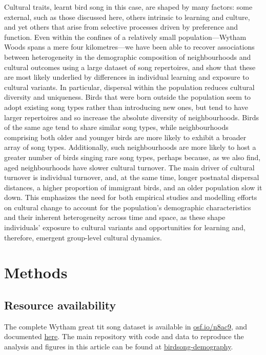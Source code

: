\documentclass[9pt, onecolumn, twoside, lineno]{gsajnl}
\begin{document}
Cultural traits, learnt bird song in this case, are shaped by many factors: some external, such as those discussed here, others intrinsic to learning and culture, and yet others that arise from selective processes driven by preference and function. Even within the confines of a relatively small population---Wytham Woods spans a mere four kilometres---we have been able to recover associations between heterogeneity in the demographic composition of neighbourhoods and cultural outcomes using a large dataset of song repertoires, and show that these are most likely underlied by differences in individual learning and exposure to cultural variants. In particular, dispersal within the population reduces cultural diversity and uniqueness. Birds that were born outside the population seem to adopt existing song types rather than introducing new ones, but tend to have larger repertoires and so increase the absolute diversity of neighbourhoods. Birds of the same age tend to share similar song types, while neighbourhoods comprising both older and younger birds are more likely to exhibit a broader array of song types. Additionally, such neighbourhoods are more likely to host a greater number of birds singing rare song types, perhaps because, as we also find, aged neighbourhoods have slower cultural turnover. The main driver of cultural turnover is individual turnover, and, at the same time, longer postnatal dispersal distances, a higher proportion of immigrant birds, and an older population slow it down. This emphasizes the need for both empirical studies and modelling efforts on cultural change to account for the population's demographic characteristics and their inherent heterogeneity across time and space, as these shape individuals' exposure to cultural variants and opportunities for learning and, therefore, emergent group-level cultural dynamics.

\section{Methods}
\label{sc:methods}

\subsection{Resource availability}

The complete Wytham great tit song dataset is available in \href{https://osf.io/n8ac9}{osf.io/n8ac9}, and documented \href{https://nilomr.github.io/great-tit-hits/}{here}. The main repository with code and data to reproduce the analysis and figures in this article can be found at \href{http://github.com/nilomr/birdsong-demography}{birdsong-demography}.
\end{document}
